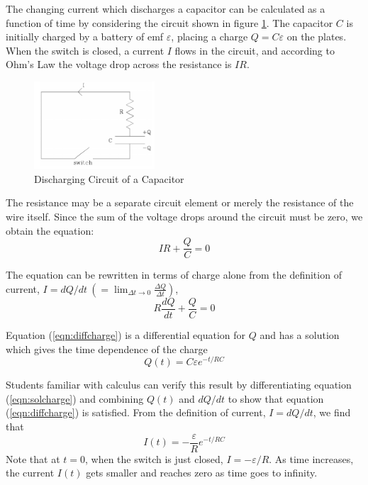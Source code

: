 The changing current which discharges a capacitor can be calculated as a function of time by considering the circuit shown in figure \ref{fig:capcircuit1}. The capacitor $C$ is initially charged by a battery of emf $\varepsilon$, placing a charge $Q = C\varepsilon$ on the plates. When the switch is closed, a current $I$ flows in the circuit, and according to Ohm's Law the voltage drop across the resistance is $IR$.

\begin{figure}[h]
    \begin{center}
        \includegraphics[width=0.4\textwidth]{./Exp3/pic/image2.png}
    \end{center}
    \caption{Discharging Circuit of a Capacitor}
    \label{fig:capcircuit1}
\end{figure}

The resistance may be a separate circuit element or merely the resistance of the wire itself. Since the sum of the voltage drops around the circuit must be zero, we obtain the equation:
\begin{equation}
    IR + \frac{Q}{C} = 0
\end{equation}

The equation can be rewritten in terms of charge alone from the definition of current, $\displaystyle I = dQ/dt \ \left(=\lim_{\Delta t\to 0} \frac{\Delta Q}{\Delta t}\right)$,
\begin{equation}
    R\frac{dQ}{dt} + \frac{Q}{C} = 0
    \label{eqn:diffcharge}
\end{equation}

Equation (\ref{eqn:diffcharge}) is a differential equation for $Q$ and has a solution which gives the time dependence of the charge
\begin{equation}
    Q(t) = C\varepsilon e^{-t/RC}
    \label{eqn:solcharge}
\end{equation}

Students familiar with calculus can verify this result by differentiating equation (\ref{eqn:solcharge}) and combining $Q(t)$ and $dQ/dt$ to show that equation (\ref{eqn:diffcharge}) is satisfied. From the definition of current, $I = dQ/dt$, we find that
\begin{equation}
    I(t) = -\frac{\varepsilon}{R}e^{-t/RC}
    \label{eqn:dischargecurrent}
\end{equation}
Note that at $t=0$, when the switch is just closed, $I = -\varepsilon/R$. As time increases, the current $I(t)$ gets smaller and reaches zero as time goes to infinity.


